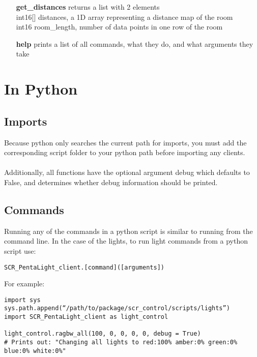 \documentclass[twoside]{article}
\begin{document}
	\begin{enumerate}

		\item[\bf get\_distances]
		returns a list with 2 elements \\
		int16[] distances, a 1D array representing a distance map of the room \\
		int16 room\_length, number of data points in one row of the room
		
		\item[\bf help] prints a list of all commands, what they do, and what arguments they take
	\end{enumerate}

	\section{In Python}


\subsection{Imports}
Because python only searches the current path for imports, you must add the corresponding script folder to your python path before importing any clients. \\ \\
Additionally, all functions have the optional argument debug which defaults to False, and determines whether debug information should be printed.

\subsection{Commands}
Running any of the commands in a python script is similar to running from the command line. In the case of the lights, to run light commands from a python script use:
\begin{verbatim}
SCR_PentaLight_client.[command]([arguments])
\end{verbatim}


For example:
\begin{verbatim}
import sys
sys.path.append(“/path/to/package/scr_control/scripts/lights”)
import SCR_PentaLight_client as light_control

light_control.ragbw_all(100, 0, 0, 0, 0, debug = True) 
# Prints out: "Changing all lights to red:100% amber:0% green:0% blue:0% white:0%"
\end{verbatim}

	
\end{document}

